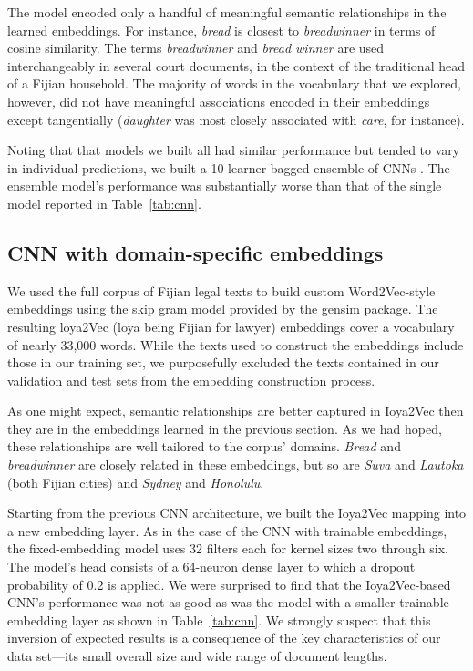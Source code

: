 \documentclass[twocolumn,10pt]{wmrDoc}
\begin{document}
The model encoded only a handful of meaningful semantic relationships in the learned embeddings.  For instance, \emph{bread} is closest to \emph{breadwinner} in terms of cosine similarity.  The terms \emph{breadwinner} and \emph{bread winner} are used interchangeably in several court documents, in the context of the traditional head of a Fijian household.  The majority of words in the vocabulary that we explored, however, did not have meaningful associations encoded in their embeddings except tangentially (\emph{daughter} was most closely associated with \emph{care}, for instance).

Noting that that models we built all had similar performance but tended to vary in individual predictions, we built a 10-learner bagged ensemble of CNNs \cite{goodfellow}.  The ensemble model's performance was substantially worse than that of the single model reported in Table~\ref{tab:cnn}. 

\subsection{CNN with domain-specific embeddings}
We used the full corpus of Fijian legal texts to build custom Word2Vec-style embeddings using the skip gram model provided by the gensim package.  The resulting loya2Vec (loya being Fijian for lawyer) embeddings cover a vocabulary of nearly 33,000 words.  While the texts used to construct the embeddings include those in our training set, we purposefully excluded the texts contained in our validation and test sets from the embedding construction process.

As one might expect, semantic relationships are better captured in Ioya2Vec then they are in the embeddings learned in the previous section.  As we had hoped, these relationships are well tailored to the corpus’ domains.  \emph{Bread} and \emph{breadwinner} are closely related in these embeddings, but so are \emph{Suva} and \emph{Lautoka} (both Fijian cities) and \emph{Sydney} and \emph{Honolulu}.

Starting from the previous CNN architecture, we built the Ioya2Vec mapping into a new embedding layer.  As in the case of the CNN with trainable embeddings, the fixed-embedding model uses 32 filters each for kernel sizes two through six.  The model’s head consists of a 64-neuron dense layer to which a dropout probability of 0.2 is applied.  We were surprised to find that the Ioya2Vec-based CNN’s performance was not as good as was the model with a smaller trainable embedding layer as shown in Table~\ref{tab:cnn}.  We strongly suspect that this inversion of expected results is a consequence of the key characteristics of our data set---its small overall size and wide range of document lengths.
\end{document}

